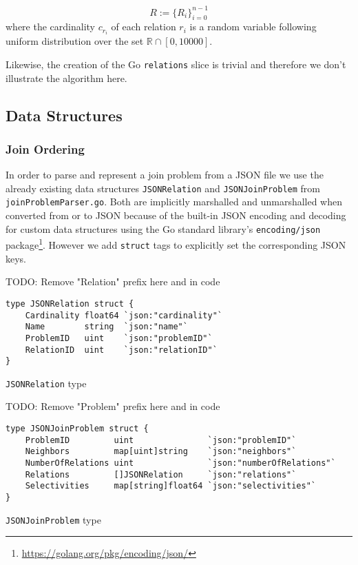 \begin{equation}
R := \{R_i\}_{i=0}^{n-1}
\end{equation}
where the cardinality $c_{r_i}$ of each relation $r_i$ is a random variable following uniform distribution over the set $\mathbb{R} \cap [0,10000]$.

Likewise, the creation of the Go \texttt{relations} slice is trivial and therefore we don't illustrate the algorithm here.

\subsection{Data Structures}
\label{sub:data-structures}

\subsubsection{Join Ordering}
In order to parse and represent a join problem from a JSON file we use the already existing data structures \texttt{JSONRelation} and \texttt{JSONJoinProblem} from \texttt{joinProblemParser.go}. Both are implicitly marshalled and unmarshalled when converted from or to JSON because of the built-in JSON encoding and decoding for custom data structures using the Go standard library's \texttt{encoding/json} package\footnote{\url{https://golang.org/pkg/encoding/json/}}. However we add \texttt{struct} tags to explicitly set the corresponding JSON keys.

TODO: Remove "Relation" prefix here and in code
\begin{code}
\begin{verbatim}
type JSONRelation struct {
    Cardinality float64 `json:"cardinality"`
    Name        string  `json:"name"`
    ProblemID   uint    `json:"problemID"`
    RelationID  uint    `json:"relationID"`
}
\end{verbatim}
\caption{\texttt{JSONRelation} type}
\end{code}
\vspace{0.8cm}

TODO: Remove "Problem" prefix here and in code
\begin{code}
\begin{verbatim}
type JSONJoinProblem struct {
    ProblemID         uint               `json:"problemID"`
    Neighbors         map[uint]string    `json:"neighbors"`
    NumberOfRelations uint               `json:"numberOfRelations"`
    Relations         []JSONRelation     `json:"relations"`
    Selectivities     map[string]float64 `json:"selectivities"`
}
\end{verbatim}
\caption{\texttt{JSONJoinProblem} type}
\end{code}
\vspace{0.8cm}

